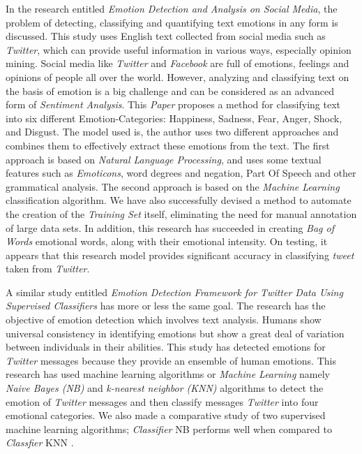 In the research entitled \textit{Emotion Detection and Analysis on Social Media}, the problem of detecting, classifying and quantifying text emotions in any form is discussed. This study uses English text collected from social media such as \textit{Twitter}, which can provide useful information in various ways, especially opinion mining. Social media like \textit{Twitter} and \textit{Facebook} are full of emotions, feelings and opinions of people all over the world. However, analyzing and classifying text on the basis of emotion is a big challenge and can be considered as an advanced form of \textit{Sentiment Analysis}. This \textit{Paper} proposes a method for classifying text into six different Emotion-Categories: Happiness, Sadness, Fear, Anger, Shock, and Disgust. The model used is, the author uses two different approaches and combines them to effectively extract these emotions from the text. The first approach is based on \textit{Natural Language Processing}, and uses some textual features such as \textit{Emoticons}, word degrees and negation, Part Of Speech and other grammatical analysis. The second approach is based on the \textit{Machine Learning} classification algorithm. We have also successfully devised a method to automate the creation of the \textit{Training Set} itself, eliminating the need for manual annotation of large data sets. In addition, this research has succeeded in creating \textit{Bag of Words} emotional words, along with their emotional intensity. On testing, it appears that this research model provides significant accuracy in classifying \textit{tweet} taken from \textit{Twitter}.

A similar study entitled \textit{Emotion Detection Framework for Twitter Data Using Supervised Classifiers} has more or less the same goal. The research has the objective of emotion detection which involves text analysis. Humans show universal consistency in identifying emotions but show a great deal of variation between individuals in their abilities. This study has detected emotions for \textit{Twitter} messages because they provide an ensemble of human emotions. This research has used machine learning algorithms or \textit{Machine Learning} namely \textit{Naive Bayes (NB)} and \textit{k-nearest neighbor (KNN)} algorithms to detect the emotion of \textit{Twitter} messages and then classify messages \textit{Twitter} into four emotional categories. We also made a comparative study of two supervised machine learning algorithms; \textit{Classifier} NB performs well when compared to \textit{Classfier} KNN .


